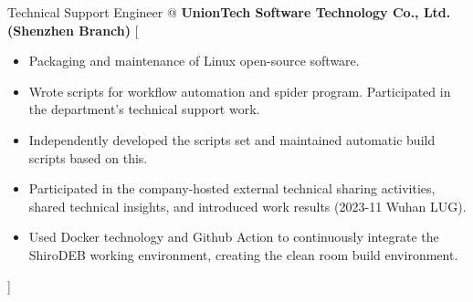 \documentclass[en]{resume}
\begin{document}

\begin{experiences}
    {Technical Support Engineer @ \textbf{UnionTech Software Technology Co., Ltd. (Shenzhen Branch)}}%
    [\begin{itemize}
		\item Packaging and maintenance of Linux open-source software.
		\item Wrote scripts for workflow automation and spider program. Participated in the department's technical support work.
		\item Independently developed the  scripts set and maintained automatic build scripts based on this.
		\item Participated in the company-hosted external technical sharing activities, shared technical insights, and introduced work results (2023-11 Wuhan LUG).
		\item Used Docker technology and Github Action to continuously integrate the ShiroDEB working environment, creating the clean room build environment.
    \end{itemize}]
\end{experiences}
\end{document}
